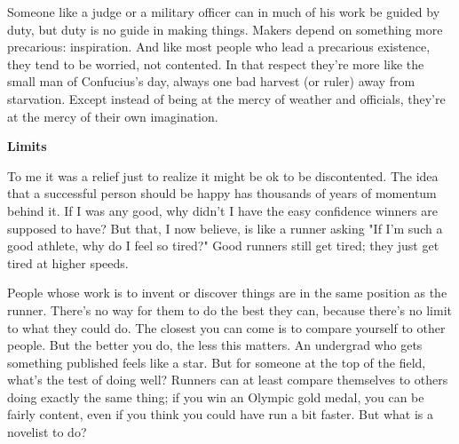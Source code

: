 Someone
                  like a judge or a military officer can in much of his work be
                  guided by duty, but duty is no guide in making things. Makers
                  depend on something more precarious: inspiration. And like
                  most people who lead a precarious existence, they tend to be
                  worried, not contented. In that respect they're more like the
                  small man of Confucius's day, always one bad harvest (or
                  ruler) away from starvation. Except instead of being at the
                  mercy of weather and officials, they're at the mercy of their
                  own imagination.

\textbf{Limits}

To me it
                  was a relief just to realize it might be ok to be
                  discontented. The idea that a successful person should be
                  happy has thousands of years of momentum behind it. If I was
                  any good, why didn't I have the easy confidence winners are
                  supposed to have? But that, I now believe, is like a runner
                  asking "If I'm such a good athlete, why do I feel so tired?"
                  Good runners still get tired; they just get tired at higher
                  speeds.

People whose work is to invent or discover
                  things are in the same position as the runner. There's no way
                  for them to do the best they can, because there's no limit to
                  what they could do. The closest you can come is to compare
                  yourself to other people. But the better you do, the less this
                  matters. An undergrad who gets something published feels like
                  a star. But for someone at the top of the field, what's the
                  test of doing well? Runners can at least compare themselves to
                  others doing exactly the same thing; if you win an Olympic
                  gold medal, you can be fairly content, even if you think you
                  could have run a bit faster. But what is a novelist to do?

